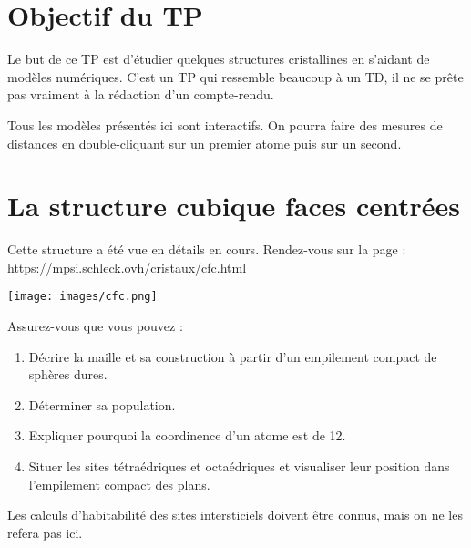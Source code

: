\documentclass[]{tp}
\begin{document}

\section{Objectif du TP}
Le but de ce TP est d'étudier quelques structures cristallines en s'aidant de modèles numériques. C'est un TP qui ressemble beaucoup à un TD, il ne se prête pas vraiment à la rédaction d'un compte-rendu.

Tous les modèles présentés ici sont interactifs. On pourra faire des mesures de distances en double-cliquant sur un premier atome puis sur un second.  

\section{La structure cubique faces centrées}
Cette structure a été vue en détails en cours. Rendez-vous sur la page : \url{https://mpsi.schleck.ovh/cristaux/cfc.html} 

\begin{center}
\texttt{[image: images/cfc.png]}
\end{center}

Assurez-vous que vous pouvez :
\begin{enumerate}
  \item Décrire la maille et sa construction à partir d'un empilement compact de sphères dures.
  \item Déterminer sa population.
  \item Expliquer pourquoi la coordinence d'un atome est de 12.
  \item Situer les sites tétraédriques et octaédriques et visualiser leur position dans l'empilement compact des plans.
\end{enumerate}
Les calculs d'habitabilité des sites intersticiels doivent être connus, mais on ne les refera pas ici.
\end{document}
